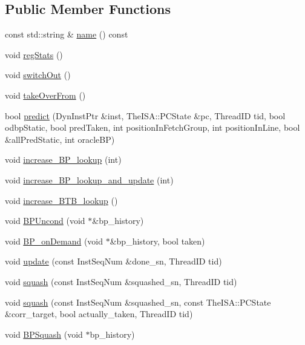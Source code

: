 \subsection*{Public Member Functions}
\begin{DoxyCompactItemize}
\item 
const std::string \& \hyperlink{classBPredUnit_aeaaeb15f110f0ed58cc3161d6f6ace22}{name} () const 
\item 
void \hyperlink{classBPredUnit_a0cffcea165538b2e7fd554a92b8d9b85}{regStats} ()
\item 
void \hyperlink{classBPredUnit_ac33c3d29c7b6aca9578fc416eb34e60e}{switchOut} ()
\item 
void \hyperlink{classBPredUnit_a9011bcc9143d2396dfec49828484a645}{takeOverFrom} ()
\item 
bool \hyperlink{classBPredUnit_add836c4a521ed2bd12eca4d1dee13620}{predict} (DynInstPtr \&inst, TheISA::PCState \&pc, ThreadID tid, bool odbpStatic, bool predTaken, int positionInFetchGroup, int positionInLine, bool \&allPredStatic, int oracleBP)
\item 
void \hyperlink{classBPredUnit_a89690e897bb5661ee868f659a06515c9}{increase\_\-BP\_\-lookup} (int)
\item 
void \hyperlink{classBPredUnit_a471a1acb994d07a6d57b2f39ce56e6a4}{increase\_\-BP\_\-lookup\_\-and\_\-update} (int)
\item 
void \hyperlink{classBPredUnit_a41ecb08c99f45538eaf1de4e184905b4}{increase\_\-BTB\_\-lookup} ()
\item 
void \hyperlink{classBPredUnit_a24bfe00e5e8c2a318930a6474ed60173}{BPUncond} (void $\ast$\&bp\_\-history)
\item 
void \hyperlink{classBPredUnit_a282f0c689c4cedfb52221c1ce96b4084}{BP\_\-onDemand} (void $\ast$\&bp\_\-history, bool taken)
\item 
void \hyperlink{classBPredUnit_aa154b29fbf52ad49d89a046e94b53ac9}{update} (const InstSeqNum \&done\_\-sn, ThreadID tid)
\item 
void \hyperlink{classBPredUnit_a94a04b4bdf8f6b9b3cf33882bc16067b}{squash} (const InstSeqNum \&squashed\_\-sn, ThreadID tid)
\item 
void \hyperlink{classBPredUnit_a78e6f48f8a11db90daab850527d48aa7}{squash} (const InstSeqNum \&squashed\_\-sn, const TheISA::PCState \&corr\_\-target, bool actually\_\-taken, ThreadID tid)
\item 
void \hyperlink{classBPredUnit_a14a43c5f5bc8c64c07a075ce1608f9c3}{BPSquash} (void $\ast$bp\_\-history)
\item 

\end{DoxyCompactItemize}

